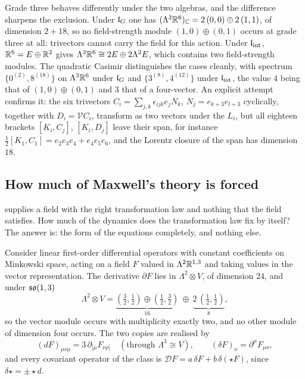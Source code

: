 Grade three behaves differently under the two algebras, and the difference sharpens the exclusion. Under $\mathfrak l_G$ one has
$(\Lambda^3\mathbb{R}^6)_{\mathbb{C}}=2\,(0,0)\oplus2\,(1,1)$, of dimension $2+18$, so no field-strength module $(1,0)\oplus(0,1)$ occurs at grade three
at all: trivectors cannot carry the field for this action. Under $\mathfrak l_{\rm int}$, $\mathbb{R}^6=E\oplus\mathbb{R}^2$ gives $\Lambda^3\mathbb{R}^6\cong2E\oplus2\Lambda^2E$,
which contains two field-strength modules. The quadratic Casimir distinguishes the cases cleanly, with spectrum $\{0^{(2)},8^{(18)}\}$
on $\Lambda^3\mathbb{R}^6$ under $\mathfrak l_G$ and $\{3^{(8)},4^{(12)}\}$ under $\mathfrak l_{\rm int}$, the value $4$ being that of $(1,0)\oplus(0,1)$ and $3$ that of a
four-vector. An explicit attempt confirms it: the six trivectors $C_i=\sum_{j,k}\epsilon_{ijk}e_jN_k$, $N_j=e_{k+3}e_{l+3}$ cyclically,
together with $D_i=\mathcal VC_i$, transform as two vectors under the $L_i$, but all eighteen brackets $[K_i,C_j]$, $[K_i,D_j]$ leave
their span, for instance $\tfrac12[K_1,C_1]=e_2e_3e_4+e_4e_5e_6$, and the Lorentz closure of the span has dimension $18$.

\subsection{How much of Maxwell's theory is forced}
\label{sec:maxwell}

 supplies a field with the right transformation law and nothing that the field satisfies. How much of the
dynamics does the transformation law fix by itself? The answer is: the form of the equations completely, and nothing else.

\begin{theorem}
\label{thm:twoops}
Consider linear first-order differential operators with constant coefficients on Minkowski space, acting on a field $F$ valued in
$\Lambda^2\mathbb{R}^{1,3}$ and taking values in the vector representation. The derivative $\partial F$ lies in $\Lambda^2\otimes V$, of
dimension $24$, and under $\mathfrak{so}(1,3)$
\[
\Lambda^2\otimes V=\underbrace{(\tfrac32,\tfrac12)\oplus(\tfrac12,\tfrac32)}_{16}\ \oplus\ \underbrace{2\,(\tfrac12,\tfrac12)}_{8},
\]
so the vector module occurs with multiplicity exactly two, and no other module of dimension four occurs. The two copies are realised
by
\[
(dF)_{\mu\nu\rho}=3\,\partial_{[\mu}F_{\nu\rho]}\quad(\text{through }\Lambda^3\cong V),\qquad (\delta F)_\nu=\partial^\mu F_{\mu\nu},
\]
and every covariant operator of the class is $\mathcal DF=a\,\delta F+b\,\delta(\star F)$, since $\delta\star=\pm\star d$.
\end{theorem}

